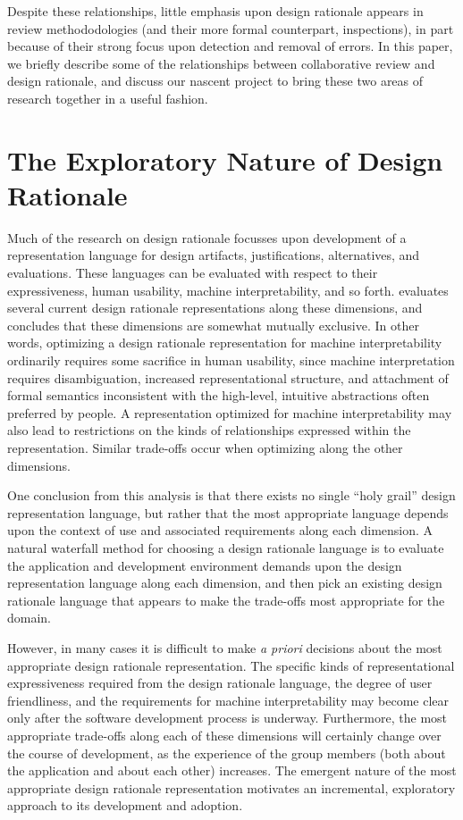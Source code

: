 Despite these relationships, little emphasis upon design rationale
appears in review methododologies (and their more formal counterpart,
inspections), in part because of their strong focus upon detection and
removal of errors.  In this paper, we briefly describe some of the
relationships between collaborative review and design rationale, and
discuss our nascent project to bring these two areas of research
together in a useful fashion.

\section{The Exploratory Nature of Design Rationale}

Much of the research on design rationale focusses upon development of
a representation language for design artifacts, justifications,
alternatives, and evaluations.  These languages can be evaluated with
respect to their expressiveness, human usability, machine
interpretability, and so forth.  \cite{Lee91} evaluates several
current design rationale representations along these dimensions, and
concludes that these dimensions are somewhat mutually exclusive.  In
other words, optimizing a design rationale representation for machine
interpretability ordinarily requires some sacrifice in human
usability, since machine interpretation requires disambiguation,
increased representational structure, and attachment of formal
semantics inconsistent with the high-level, intuitive abstractions
often preferred by people. A representation optimized for machine
interpretability may also lead to restrictions on the kinds of
relationships expressed within the representation.  Similar trade-offs
occur when optimizing along the other dimensions.

One conclusion from this analysis is that there exists no single
``holy grail'' design representation language, but rather that the
most appropriate language depends upon the context of use and associated
requirements along each dimension.  A natural waterfall method for
choosing a design rationale language is to evaluate the application
and development environment demands upon the design representation
language along each dimension, and then pick an existing design
rationale language that appears to make the trade-offs most 
appropriate for the domain. 

However, in many cases it is difficult to make {\em a priori}
decisions about the most appropriate design rationale representation.
The specific kinds of representational expressiveness required from
the design rationale language, the degree of user friendliness, and
the requirements for machine interpretability may become clear only
after the software development process is underway.  Furthermore, the
most appropriate trade-offs along each of these dimensions will
certainly change over the course of development, as the experience of
the group members (both about the application and about each other)
increases. The emergent nature of the most appropriate design
rationale representation motivates an incremental, exploratory
approach to its development and adoption.

